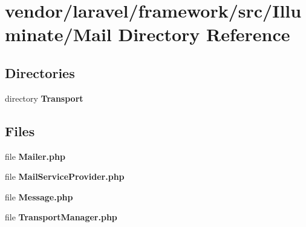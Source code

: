 \section{vendor/laravel/framework/src/\+Illuminate/\+Mail Directory Reference}
\label{dir_25c1c0e6e89db1212324a2fdcdba861c}
\subsection*{Directories}
\begin{DoxyCompactItemize}
\item 
directory {\bf Transport}
\end{DoxyCompactItemize}
\subsection*{Files}
\begin{DoxyCompactItemize}
\item 
file {\bf Mailer.\+php}
\item 
file {\bf Mail\+Service\+Provider.\+php}
\item 
file {\bf Message.\+php}
\item 
file {\bf Transport\+Manager.\+php}
\end{DoxyCompactItemize}
